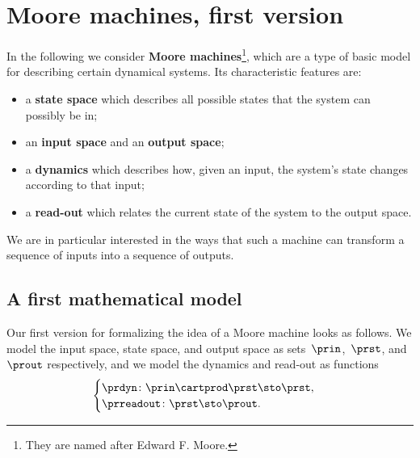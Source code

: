
\section{Moore machines, first version}
\label{sec:moore-machines}



In the following we consider \textbf{Moore machines}\footnote{They are named after Edward F.
    Moore.
}, which are a type of basic model for describing certain dynamical systems.
Its characteristic features are:
\begin{itemize}
    \item a \textbf{state space} which describes all possible states that the system can possibly be in;
    \item an \textbf{input space} and an \textbf{output space};
    \item a \textbf{dynamics} which describes how, given an input, the system's state changes according to that input;
    \item a \textbf{read-out} which relates the current state of the system to the output space.
\end{itemize}
%
We are in particular interested in the ways that such a machine can transform a sequence of inputs into a sequence of outputs.

\subsection{A first mathematical model}

Our first version for formalizing the idea of a Moore machine looks as follows.
We model the input space, state space, and output space as sets~$\prin$,~$\prst$, and~$\prout$ respectively, and we model the dynamics and read-out as functions
\begin{equation}
    \label{eq:moore-1}
    \begin{cases}
        \prdyn \colon \prin \cartprod \prst \sto \prst, \\
        \prreadout \colon \prst \sto \prout.
    \end{cases}
\end{equation}


